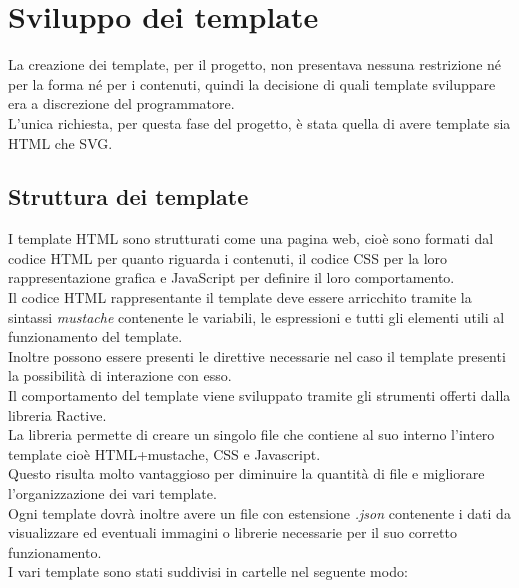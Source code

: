 \section{Sviluppo dei template}
La creazione dei template, per il progetto, non presentava nessuna restrizione né per la forma né per i contenuti, quindi la decisione di quali template sviluppare era a discrezione del programmatore.\\
L'unica richiesta, per questa fase del progetto, è stata quella di avere template sia HTML che SVG.\\
\subsection{Struttura dei template}
I template HTML sono strutturati come una pagina web, cioè sono formati dal codice HTML per quanto riguarda i contenuti, il codice CSS per la loro rappresentazione grafica e JavaScript per definire il loro comportamento.\\
Il codice HTML rappresentante il template deve essere arricchito tramite la sintassi \textit{mustache} contenente le variabili, le espressioni e tutti gli elementi utili al funzionamento del template.\\
Inoltre possono essere presenti le direttive necessarie nel caso il template presenti la possibilità di interazione con esso.\\
Il comportamento del template viene sviluppato tramite gli strumenti offerti dalla libreria Ractive.\\
La libreria permette di creare un singolo file che contiene al suo interno l'intero template cioè HTML+mustache, CSS e Javascript.\\
Questo risulta molto vantaggioso per diminuire la quantità di file e migliorare l'organizzazione dei vari template.\\
Ogni template dovrà inoltre avere un file con estensione \textit{.json} contenente i dati da visualizzare ed eventuali immagini o librerie necessarie per il suo corretto funzionamento.\\
I vari template sono stati suddivisi in cartelle nel seguente modo:
